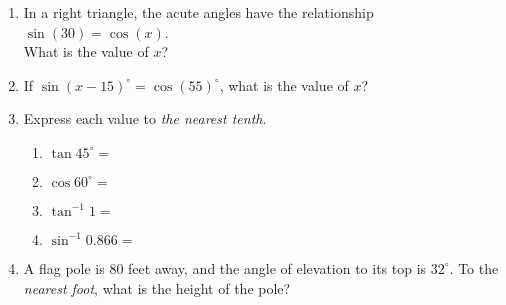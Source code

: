 \documentclass[12pt, twoside]{article}
\begin{document}
\begin{enumerate}
  \item In a right triangle, the acute angles have the relationship $\sin (30)=\cos(x)$.\\[0.25cm]
    What is the value of $x$? \vspace{3cm}

  \item If $\sin (x-15)^\circ = \cos(55)^\circ$, what is the value of $x$? \vspace{5cm}

  \item Express each value to \emph{the nearest tenth}.  \vspace{0.5cm}
    \begin{multicols}{2}
      \begin{enumerate}
        \item $\tan 45^\circ = $ \vspace{1cm}
        \item $\cos 60^\circ =$
        \item $\tan^{-1} 1 = $ \vspace{1cm}
        \item $\sin^{-1} 0.866 =$
      \end{enumerate}
    \end{multicols}

\newpage

  \item A flag pole is 80 feet away, and the angle of elevation to its top is $32^\circ$. To the \emph{nearest foot}, what is the height of the pole?\\
    \vspace{4cm}


\end{enumerate}
\end{document}
